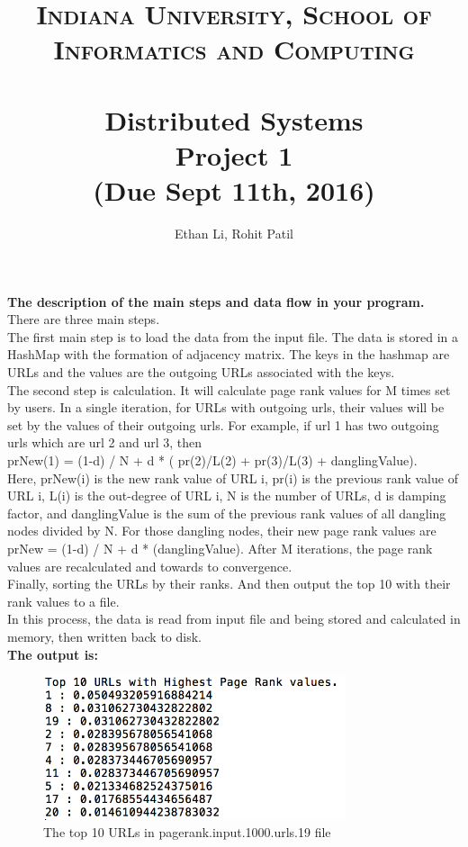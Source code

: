 \documentclass[paper=a4, fontsize=11pt]{scrartcl} %
\title{	
\normalfont \normalsize
\textsc{Indiana University, School of Informatics and Computing} \\ [25pt] %
\horrule{0.5pt} \\[0.4cm] %
\huge Distributed Systems \\ %
\huge Project 1 \\ %
\normalsize(Due Sept 11th, 2016)
\horrule{2pt} \\[0.5cm] %
}
\author{Ethan Li, Rohit Patil} %
\date{} %
\numberwithin{equation}{section} %
\numberwithin{figure}{section} %
\numberwithin{table}{section} %
\begin{document}
\maketitle %

 

\textbf{The description of the main steps and data flow in your program.}\\

There are three main steps.\\

The first main step is to load the data from the input file. The data is stored in a HashMap with the formation of adjacency matrix.  The keys in the hashmap are URLs and the values are the outgoing URLs associated with the keys. \\

The second step is calculation. It will calculate page rank values for M times set by users. In a single iteration, for URLs with outgoing urls, their values will be set by the values of their outgoing urls. For example, if url 1 has two outgoing urls which are url 2 and url 3, then \\
prNew(1) = (1-d) / N + d * ( pr(2)/L(2) + pr(3)/L(3) + danglingValue). \\
Here, prNew(i) is the new rank value of URL i, pr(i) is the previous rank value of URL i, L(i) is the out-degree of URL i, N is the number of URLs, d is damping factor, and danglingValue is the sum of the previous rank values of all dangling nodes divided by N. For those dangling nodes, their new page rank values are  prNew = (1-d) / N + d * (danglingValue). After M iterations, the page rank values are recalculated and towards to convergence.\\

Finally, sorting the URLs by their ranks. And then output the top 10 with their rank values to a file.\\

In this process, the data is read from input file and being stored and calculated in memory, then written back to disk.\\



\textbf{The output is:}
\begin{figure}[htbp]
\centering\includegraphics[width=3.5in]{output.png}
\caption{The top 10 URLs in pagerank.input.1000.urls.19 file }\label{Gorilla}
\end{figure}
 
 





\end{document}
